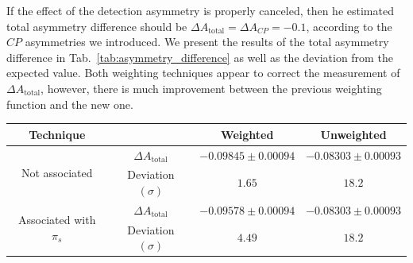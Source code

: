 \documentclass{article}
\begin{document}
        If the effect of the detection asymmetry is properly canceled, then he estimated total asymmetry difference should be $\Delta A_\text{total} = \Delta A_{CP} = -0.1$, according to the $CP$ asymmetries we introduced. 
        We present the results of the total asymmetry difference in Tab.~\ref{tab:asymmetry_difference} as well as the deviation from the expected value.
        Both weighting techniques appear to correct the measurement of $\Delta A_\text{total}$, however, there is much improvement between the previous weighting function and the new one.
        \begin{center}
                \begin{tabular}{c|c|c|c}
                        Technique& & Weighted & Unweighted\\
                        \hline\hline
                        \multirow{2}{*}{Not associated} & $\Delta A_\text{total}$ & $-0.09845 \pm 0.00094$ & $-0.08303 \pm 0.00093$\\
                        & Deviation $(\sigma)$ & $1.65$ & $18.2$\\
                        \hline
                        \multirow{2}{*}{Associated with $\pi_s$} & $\Delta A_\text{total}$ & $-0.09578 \pm 0.00094$ & $-0.08303 \pm 0.00093$\\
                        & Deviation $(\sigma)$ & $4.49$ & $18.2$\\
                \end{tabular}
                \label{tab:asymmetry_difference}
        \end{center}
\end{document}
